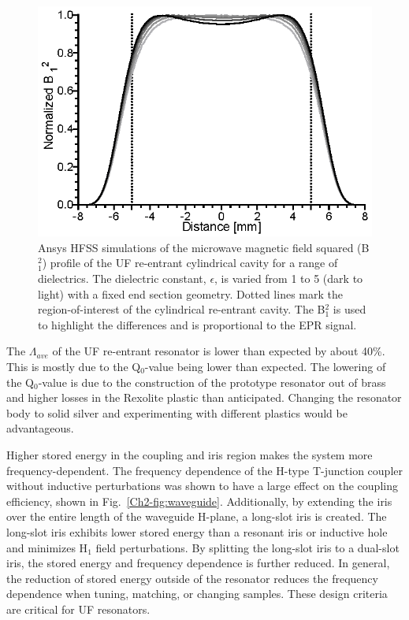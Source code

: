 \begin{figure}[htb]\centering
 \includegraphics{Kapitel/Ch2-Images/07-TE01Udielectirc.eps}
 \caption[Ansys HFSS simulations of with varying samples.]{Ansys HFSS simulations of the microwave magnetic field squared (B$^2_1$) profile of the UF re-entrant cylindrical \cylTE{} cavity for a range of dielectrics. The dielectric constant, $\epsilon$, is varied from 1 to 5 (dark to light) with a fixed end section geometry. Dotted lines mark the region-of-interest of the cylindrical re-entrant \cylTE{} cavity.  The B$^2_1$ is used to highlight the differences and is proportional to the EPR signal. }
 \label{Ch2-fig:dielectric}
\end{figure}

The $\Lambda_{ave}$ of the UF re-entrant \cylTE{} resonator is lower than expected by about 40\%. This is mostly due to the Q$_0$-value being lower than expected. The lowering of the Q$_0$-value is due to the construction of the prototype resonator out of brass and higher losses in the Rexolite plastic than anticipated. Changing the resonator body to solid silver and experimenting with different plastics would be advantageous. 

Higher stored energy in the coupling and iris region makes the system more frequency-dependent. The frequency dependence of the H-type T-junction coupler without inductive perturbations was shown to have a large effect on the coupling efficiency, shown in Fig.~\ref{Ch2-fig:waveguide}. Additionally, by extending the iris over the entire length of the waveguide H-plane, a long-slot iris is created. \cite{Mett2009} The long-slot iris exhibits lower stored energy than a resonant iris or inductive hole and minimizes H$_1$ field perturbations. By splitting the long-slot iris to a dual-slot iris, the stored energy and frequency dependence is further reduced. In general, the reduction of stored energy outside of the resonator reduces the frequency dependence when tuning, matching, or changing samples. These design criteria are critical for UF resonators. 

